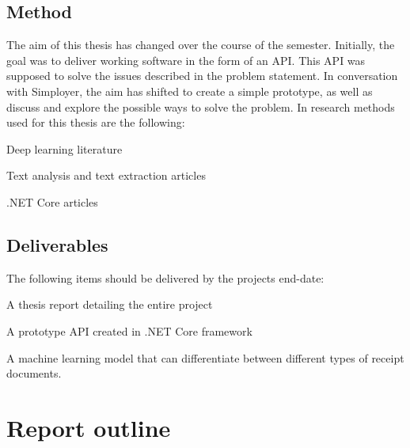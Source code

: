 \subsection{Method}\label{subsec:method}
The aim of this thesis has changed over the course of the semester.
Initially, the goal was to deliver working software in the form of an API.
This API was supposed to solve the issues described in the problem statement.
In conversation with Simployer, the aim has shifted to create a simple prototype, as well as discuss and explore the possible ways to solve the problem.
In research methods used for this thesis are the following:
\begin{compactitem}
    \item Deep learning literature
    \item Text analysis and text extraction articles
    \item .NET Core articles
    \item
\end{compactitem}

\subsection{Deliverables}\label{subsec:deliverables}
The following items should be delivered by the projects end-date:
\begin{compactitem}
    \item A thesis report detailing the entire project
    \item A prototype API created in .NET Core framework
    \item A machine learning model that can differentiate between different types of receipt documents.
\end{compactitem}

\section{Report outline}\label{sec:report-outline}



